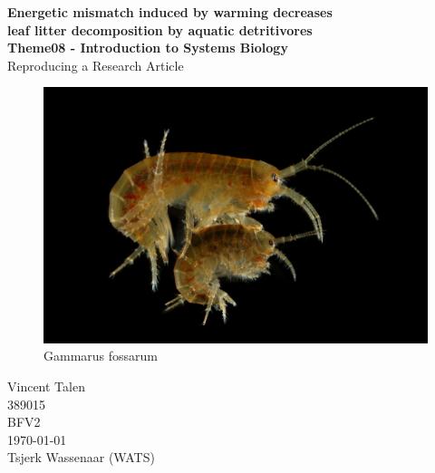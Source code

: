 


\begin{center}
  \topskip=45pt
  \LARGE{\textbf{Energetic mismatch induced by warming decreases\\leaf litter decomposition by aquatic detritivores}}\\
  \vspace*{20pt}
  \large{\textbf{Theme08 - Introduction to Systems Biology}}\\
  \large{Reproducing a Research Article}\\
  \vspace*{40pt}
  \begin{figure}
    \centering
    \includegraphics[width=130mm]{figures/gammarus_fossarum.jpeg}
    \caption{Gammarus fossarum}
    \label{fig:g.fossarum}
  \end{figure}
\end{center}
\vspace*{\fill}
\begin{flushright}
  Vincent Talen\\
  389015\\
  BFV2\\
  \today\\
  Tsjerk Wassenaar (WATS)\\
\end{flushright}


\newpage
\null


